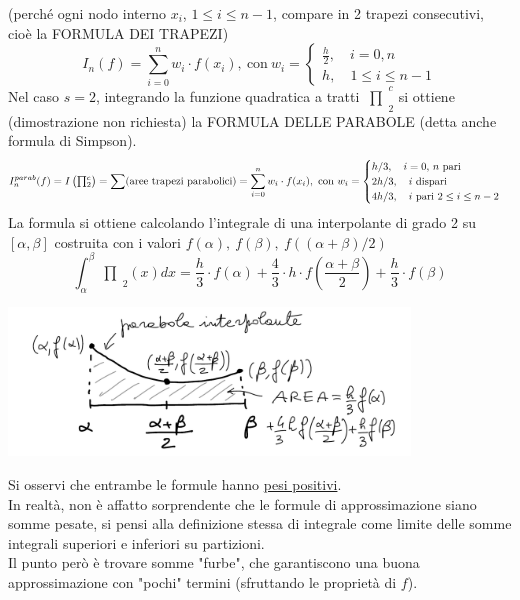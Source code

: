 \documentclass[12pt,a4paper]{article}
\newcommand{\inter}{\begin{matrix}\prod\end{matrix}}
\begin{document}
(perché ogni nodo interno $x_i$, $1 \leq i \leq n-1$, compare in 2 trapezi consecutivi, cioè la FORMULA DEI TRAPEZI)
\[
I_n (f) = \sum_{i=0}^n w_i \cdot f(x_i), \ \text{con} \ w_i =
\begin{cases}
\frac{h}{2}, \quad i=0,n \\
h, \quad 1 \le i \le n-1
\end{cases}
\]
Nel caso $s=2$, integrando la funzione quadratica a tratti $\inter_2^c$ si ottiene (dimostrazione non richiesta) la FORMULA DELLE PARABOLE (detta anche formula di Simpson).
\[
I_n^{parab} (f) = I \left(\inter_2^c\right) = \sum (\text{aree trapezi parabolici}) \\
= \sum_{i=0}^n w_i \cdot f(x_i), \ \text{con} \ w_i = 
\begin{cases}
h/3,  \quad i=0, \, n \text { pari}\\
2h/3, \quad i \ \text{dispari}\\
4h/3, \quad i \ \text{pari} \ 2 \leq i \leq n-2
\end{cases}
\]
La formula si ottiene calcolando l'integrale di una interpolante di grado 2 su $[\alpha, \beta]$ costruita con i valori $f(\alpha), \ f(\beta), \ f((\alpha+\beta)/2)$
\[
\int_\alpha^\beta \inter_2 (x) dx = \frac{h}{3} \cdot f(\alpha) + \frac{4}{3} \cdot h \cdot f\left(\frac{\alpha + \beta}{2}\right) + \frac{h}{3} \cdot f(\beta)
\]
\begin{center}
    \includegraphics[width=0.8\textwidth]{pag21.png}
\end{center}
Si osservi che entrambe le formule hanno \underline{pesi positivi}.\\
In realtà, non è affatto sorprendente che le formule di approssimazione siano somme pesate, si pensi alla definizione stessa di integrale come limite delle somme integrali superiori e inferiori su partizioni.\\
Il punto però è trovare somme "furbe", che garantiscono una buona approssimazione con "pochi" termini (sfruttando le proprietà di $f$).\\\\
\\
\end{document}
